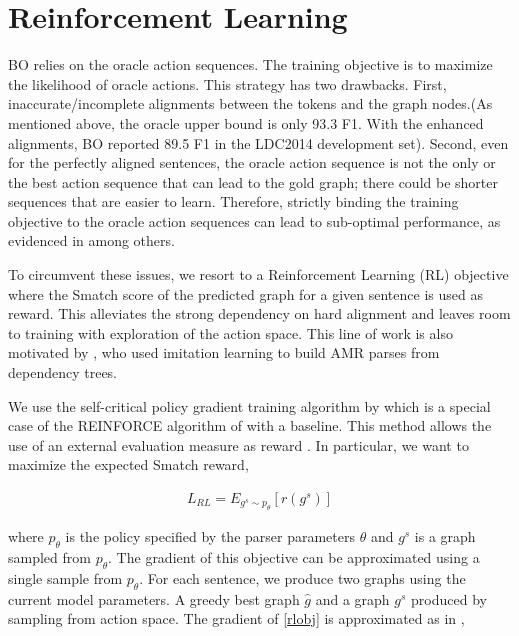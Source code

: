 \documentclass[11pt,a4paper]{article}
\begin{document}
\section{Reinforcement Learning}

BO relies on the oracle action sequences. The training objective is to maximize the likelihood of oracle actions. This strategy has two drawbacks. First, inaccurate/incomplete alignments between the tokens and the graph nodes.(As mentioned above, the oracle upper bound is only 93.3 F1. With the enhanced alignments, BO reported 89.5 F1 in the LDC2014 development set). Second, even for the perfectly aligned sentences, the oracle action sequence is not the only or the best action sequence that can lead to the gold graph; there could be shorter sequences that are easier to learn. Therefore, strictly binding the training objective to the oracle action sequences can lead to sub-optimal performance, as evidenced in \cite{daume05,daume09,goldberg12coling,goldberg2013training,D16-1211} among others.  

To circumvent these issues, we resort to a Reinforcement Learning (RL) objective where the Smatch score of the predicted graph for a given sentence is used as reward. This alleviates the strong dependency on hard alignment and leaves room to training with exploration of the action space. This line of work is also motivated by , who used imitation learning to build AMR parses from dependency trees.

We use the self-critical policy gradient training algorithm by  which is a special case of the REINFORCE algorithm of  with a baseline. This method allows the use of an external evaluation measure as reward \cite{paulus2017deep}. In particular, we want to maximize the expected Smatch reward,

\begin{align}
L_{RL}=E_{g^s \sim p_{\theta}}[r(g^s)] \label{rlobj}
\end{align}

where $p_{\theta}$ is the policy specified by the parser parameters $\theta$ and $g^s$ is a graph sampled from $p_{\theta}$. The gradient of this objective can be approximated using a single sample from $p_{\theta}$. For each sentence, we produce two graphs using the current model parameters. A greedy best graph $\hat{g}$ and a graph $g^s$ produced by sampling from action space. The gradient of \ref{rlobj} is approximated as in \cite{rennie2017self},
\end{document}
